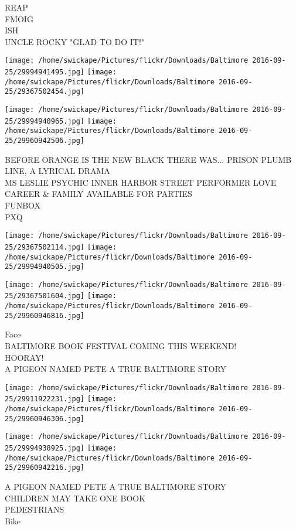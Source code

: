 \documentclass[10pt,letterpaper]{article}
\begin{document}
REAP\\
FMOIG\\
ISH\\
UNCLE ROCKY "GLAD TO DO IT!"
\pagebreak

\texttt{[image: /home/swickape/Pictures/flickr/Downloads/Baltimore 2016-09-25/29994941495.jpg]}
\texttt{[image: /home/swickape/Pictures/flickr/Downloads/Baltimore 2016-09-25/29367502454.jpg]}

\texttt{[image: /home/swickape/Pictures/flickr/Downloads/Baltimore 2016-09-25/29994940965.jpg]}
\texttt{[image: /home/swickape/Pictures/flickr/Downloads/Baltimore 2016-09-25/29960942506.jpg]}

BEFORE ORANGE IS THE NEW BLACK THERE WAS... PRISON PLUMB LINE, A LYRICAL DRAMA\\
MS LESLIE PSYCHIC INNER HARBOR STREET PERFORMER LOVE CAREER \& FAMILY AVAILABLE FOR PARTIES\\
FUNBOX\\
PXQ
\pagebreak

\texttt{[image: /home/swickape/Pictures/flickr/Downloads/Baltimore 2016-09-25/29367502114.jpg]}
\texttt{[image: /home/swickape/Pictures/flickr/Downloads/Baltimore 2016-09-25/29994940505.jpg]}

\texttt{[image: /home/swickape/Pictures/flickr/Downloads/Baltimore 2016-09-25/29367501604.jpg]}
\texttt{[image: /home/swickape/Pictures/flickr/Downloads/Baltimore 2016-09-25/29960946816.jpg]}

Face\\
BALTIMORE BOOK FESTIVAL COMING THIS WEEKEND!\\
HOORAY!\\
A PIGEON NAMED PETE A TRUE BALTIMORE STORY
\pagebreak

\texttt{[image: /home/swickape/Pictures/flickr/Downloads/Baltimore 2016-09-25/29911922231.jpg]}
\texttt{[image: /home/swickape/Pictures/flickr/Downloads/Baltimore 2016-09-25/29960946306.jpg]}

\texttt{[image: /home/swickape/Pictures/flickr/Downloads/Baltimore 2016-09-25/29994938925.jpg]}
\texttt{[image: /home/swickape/Pictures/flickr/Downloads/Baltimore 2016-09-25/29960942216.jpg]}

A PIGEON NAMED PETE A TRUE BALTIMORE STORY\\
CHILDREN MAY TAKE ONE BOOK\\
PEDESTRIANS\\
Bike
\pagebreak
\end{document}
